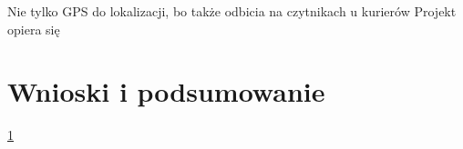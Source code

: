 \documentclass[eng,printmode,oneside]{mgr}
\begin{document}
	
 Nie tylko GPS do lokalizacji, bo także odbicia
na czytnikach u kurierów Projekt opiera się 

\chapter{Wnioski i podsumowanie}

\ref{}


\listoffigures
\lstlistoflistings
\end{document}
